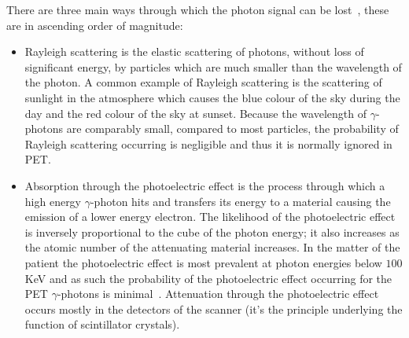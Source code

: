                 There are three main ways through which the photon signal can be lost~, these are in ascending order of magnitude:
                
                \begin{itemize}
                    
                    \item Rayleigh scattering is the elastic scattering of photons, without loss of significant energy, by particles which are much smaller than the wavelength of the photon. A common example of Rayleigh scattering is the scattering of sunlight in the atmosphere which causes the blue colour of the sky during the day and the red colour of the sky at sunset. Because the wavelength of $\gamma$-photons are comparably small, compared to most particles, the probability of Rayleigh scattering occurring is negligible and thus it is normally ignored in \gls{PET}.
                    
                    \item Absorption through the photoelectric effect is the process through which a high energy $\gamma$-photon hits and transfers its energy to a material causing the emission of a lower energy electron. The likelihood of the photoelectric effect is inversely proportional to the cube of the photon energy; it also increases as the atomic number of the attenuating material increases. In the matter of the patient the photoelectric effect is most prevalent at photon energies below $100$ \gls{KeV} and as such the probability of the photoelectric effect occurring for the \gls{PET} $\gamma$-photons is minimal~. %
                    Attenuation through the photoelectric effect occurs mostly in the detectors of the scanner (it's the principle underlying the function of scintillator crystals).
                    

\end{itemize}
